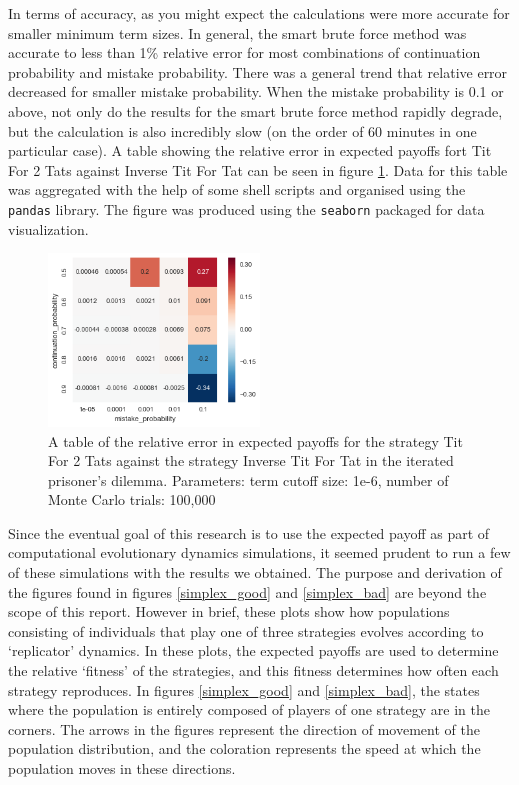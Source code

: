 \documentclass[a4paper,12pt]{article}
\begin{document}
In terms of accuracy, as you might expect the calculations were more accurate for smaller minimum term sizes.
In general, the smart brute force method was accurate to less than 1\% relative error for most combinations of continuation probability and mistake probability.
There was a general trend that relative error decreased for smaller mistake probability.
When the mistake probability is 0.1 or above, not only do the results for the smart brute force method rapidly degrade, but the calculation is also incredibly slow (on the order of 60 minutes in one particular case).
A table showing the relative error in expected payoffs fort Tit For 2 Tats against Inverse Tit For Tat can be seen in figure \ref{error_table}.
Data for this table was aggregated with the help of some shell scripts and organised using the \texttt{pandas} library.
The figure was produced using the \texttt{seaborn} packaged for data visualization.

\begin{figure}
    \caption{A table of the relative error in expected payoffs for the strategy Tit For 2 Tats against the strategy Inverse Tit For Tat in the iterated prisoner's dilemma. Parameters: term cutoff size: 1e-6, number of Monte Carlo trials: 100,000}
    \label{error_table}
    \centering
        \includegraphics[width=0.5\textwidth]{error_table}
\end{figure}

Since the eventual goal of this research is to use the expected payoff as part of computational evolutionary dynamics simulations, it seemed prudent to run a few of these simulations with the results we obtained.
The purpose and derivation of the figures found in figures \ref{simplex_good} and \ref{simplex_bad} are beyond the scope of this report.
However in brief, these plots show how populations consisting of individuals that play one of three strategies evolves according to `replicator' dynamics.
In these plots, the expected payoffs are used to determine the relative `fitness' of the strategies, and this fitness determines how often each strategy reproduces.
In figures \ref{simplex_good} and \ref{simplex_bad}, the states where the population is entirely composed of players of one strategy are in the corners.
The arrows in the figures represent the direction of movement of the population distribution, and the coloration represents the speed at which the population moves in these directions.
\end{document}
